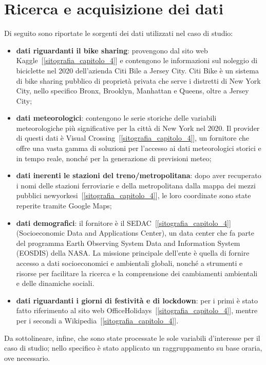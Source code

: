 \section[Ricerca e acquisizione dati]{Ricerca e acquisizione dei dati}
Di seguito sono riportate le sorgenti dei dati utilizzati nel caso di studio:
\begin{itemize}
	\item \textbf{dati riguardanti il bike sharing}: provengono dal sito web Kaggle~[\ref{sitografia_capitolo_4}] e contengono le informazioni sul noleggio di biciclette nel \num{2020} dell'azienda Citi Bile a Jersey City. Citi Bike è un sistema di bike sharing pubblico di proprietà privata che serve i distretti di New York City, nello specifico Bronx, Brooklyn, Manhattan e Queens, oltre a Jersey City;
	\item \textbf{dati meteorologici}: contengono le serie storiche delle variabili meteorologiche più significative per la città di New York nel \num{2020}. Il provider di questi dati è Visual Crossing~[\ref{sitografia_capitolo_4}], un fornitore che offre una vasta gamma di soluzioni per l'accesso ai dati meteorologici storici e in tempo reale, nonché per la generazione di previsioni meteo;
	\item \textbf{dati inerenti le stazioni del treno/metropolitana}: dopo aver recuperato i nomi delle stazioni ferroviarie e della metropolitana dalla mappa dei mezzi pubblici newyorkesi~[\ref{sitografia_capitolo_4}], le loro coordinate sono state reperite tramite Google Maps;
	\item \textbf{dati demografici}: il fornitore è il SEDAC~[\ref{sitografia_capitolo_4}] (Socioeconomic Data and Applications Center), un data center che fa parte del programma Earth Observing System Data and Information System (EOSDIS) della NASA. La missione principale dell'ente è quella di fornire accesso a dati socioeconomici e ambientali globali, nonché a strumenti e risorse per facilitare la ricerca e la comprensione dei cambiamenti ambientali e delle dinamiche sociali.
	\item \textbf{dati riguardanti i giorni di festività e di lockdown}: per i primi è stato fatto riferimento al sito web OfficeHolidays~[\ref{sitografia_capitolo_4}], mentre per i secondi a Wikipedia~[\ref{sitografia_capitolo_4}].
\end{itemize}
Da sottolineare, infine, che sono state processate le sole variabili d'interesse per il caso di studio; nello specifico è stato applicato un raggruppamento su base oraria, ove necessario.

